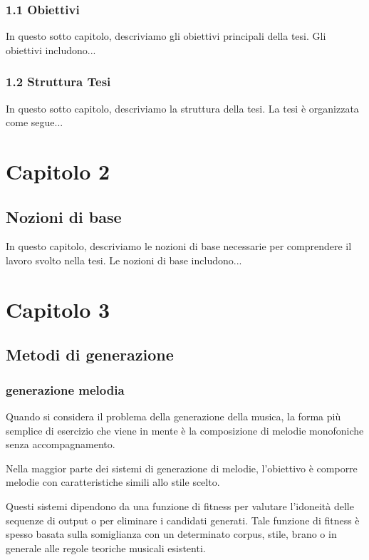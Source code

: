 \documentclass[a4paper,12pt]{report}
\begin{document}
\subsection*{1.1 Obiettivi}
In questo sotto capitolo, descriviamo gli obiettivi principali della tesi. Gli obiettivi includono...

\subsection*{1.2 Struttura Tesi}
In questo sotto capitolo, descriviamo la struttura della tesi. La tesi è organizzata come segue...

\chapter*{Capitolo 2}
\section*{Nozioni di base}
In questo capitolo, descriviamo le nozioni di base necessarie per comprendere il lavoro svolto nella tesi. Le nozioni di base includono...

\chapter*{Capitolo 3}
\section*{Metodi di generazione}

\subsection*{generazione melodia}

Quando si considera il problema della generazione della musica, la forma più semplice di esercizio che viene in mente è la composizione di melodie monofoniche senza accompagnamento.

Nella maggior parte dei sistemi di generazione di melodie, l'obiettivo è comporre melodie con caratteristiche simili allo stile scelto.

Questi sistemi dipendono da una funzione di fitness per valutare l'idoneità delle sequenze di output o per eliminare i candidati generati. 
Tale funzione di fitness è spesso basata sulla somiglianza con un determinato corpus, stile, brano o in generale alle regole teoriche musicali esistenti.
\end{document}

